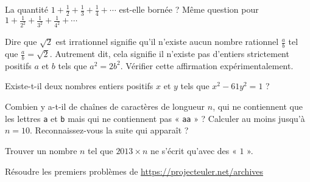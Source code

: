 % 
% 


\begin{question}
La quantité
$1 + \frac{1}{2} + \frac{1}{3} + \frac{1}{4} + \cdots$
est-elle bornée ?
Même question pour
$1 + \frac{1}{2^2} + \frac{1}{3^2} + \frac{1}{4^2} + \cdots$
\end{question}


\begin{question}
Dire que $\sqrt{2}$ est irrationnel signifie qu'il n'existe aucun nombre rationnel $\frac{a}{b}$ tel que $\frac{a}{b} = \sqrt{2}$.
Autrement dit, cela signifie il n'existe pas d'entiers strictement positifs $a$ et $b$ tels que $a^2 = 2b^2$.
Vérifier cette affirmation expérimentalement.
\end{question}


\begin{question}
Existe-t-il deux nombres entiers positifs $x$ et $y$ tels que $x^2 - 61y^2 = 1$ ?
\end{question}


\begin{question}
Combien y a-t-il de chaînes de caractères de longueur $n$,
qui ne contiennent que les lettres \texttt{a} et \texttt{b}
mais qui ne contiennent pas « \texttt{aa} » ?
Calculer au moins jusqu'à $n = 10$.
Reconnaissez-vous la suite qui apparaît ?
\end{question}


\begin{question}
Trouver un nombre $n$ tel que $2013 \times n$ ne s'écrit qu'avec des « $1$ ».
\end{question}


\begin{question}
    Résoudre les premiers problèmes de
    \url{https://projecteuler.net/archives}
\end{question}
